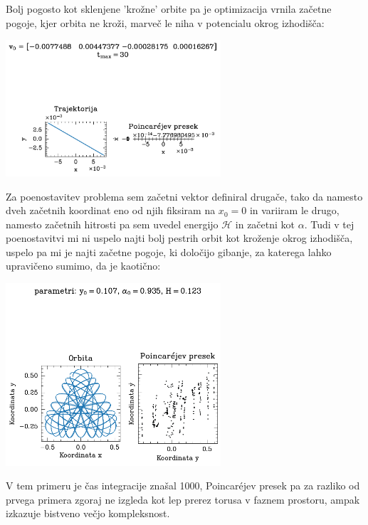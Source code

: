 Bolj pogosto kot sklenjene 'krožne' orbite pa je optimizacija vrnila začetne pogoje, kjer orbita ne kroži, marveč le niha v potencialu okrog izhodišča:
\begin{center}
    \includegraphics[width=0.6\textwidth]{../images/2-1-periorbita-2.pdf}
    \end{center}
\clearpage
Za poenostavitev problema sem začetni vektor definiral drugače, tako da namesto dveh začetnih koordinat eno od njih fiksiram na $x_0 = 0$ in variiram le drugo, namesto začetnih hitrosti pa sem uvedel energijo $\mathcal{H}$ in začetni kot $\alpha$. Tudi v tej poenostavitvi mi ni uspelo najti bolj pestrih orbit kot kroženje okrog izhodišča, uspelo pa mi je najti začetne pogoje, ki določijo gibanje, za katerega lahko upravičeno sumimo, da je kaotično:

\begin{center}
    \includegraphics[width=0.6\textwidth]{../images/2024-2-kaoticna.png}
\end{center}
V tem primeru je čas integracije znašal 1000, Poincar\'{e}jev presek pa za razliko od prvega primera zgoraj ne izgleda kot lep prerez torusa v faznem prostoru, ampak izkazuje bistveno večjo kompleksnost.